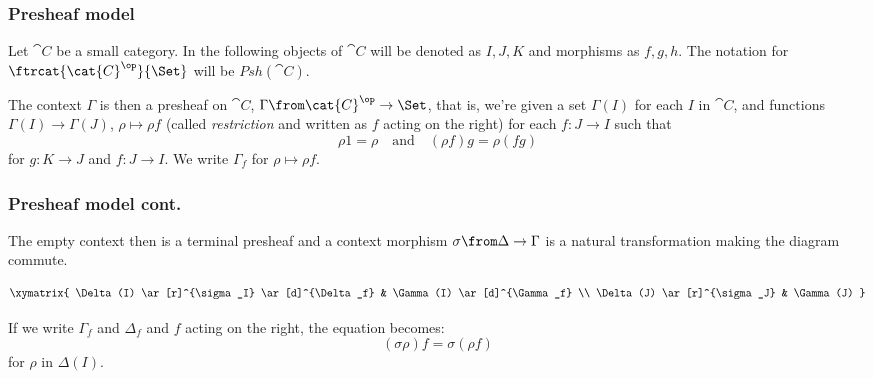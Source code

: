 \documentclass{beamer}
\begin{document}
\begin{frame}
  \frametitle{Presheaf model}

  Let $\cat{C}$ be a small category. In the following objects of $\cat{C}$ will
  be denoted as $I,J,K$ and morphisms as $f,g,h$. The notation for
  $\ftrcat{\cat{C}^\op}{\Set}$ will be $Psh(\cat{C})$.

  The context $\Gamma$ is then a presheaf on $\cat{C}$, $\Gamma \from
  \cat{C}^\op \to \Set$, that is, we're given a set $\Gamma(I)$ for each
  $I$ in $\cat{C}$, and functions $\Gamma(I) \to \Gamma(J)$, $\rho \mapsto \rho
  f$ (called \emph{restriction} and written as $f$ acting on the right) for each
  $f: J \to I$ such that
  \[
    \rho 1 = \rho \quad \text{and} \quad (\rho f) g = \rho (f g)
  \]
  for $g: K \to J$ and $f: J \to I$. We write $\Gamma_f$ for $\rho \mapsto \rho
  f$.
\end{frame}

\begin{frame}

  \frametitle{Presheaf model cont.}

  The empty context then is a terminal presheaf and a context morphism $\sigma
  \from \Delta \to \Gamma$ is a natural transformation making the diagram
  commute.

  \[
    \xymatrix{
      \Delta(I) \ar[r]^{\sigma_I} \ar[d]^{\Delta_f} & \Gamma(I) \ar[d]^{\Gamma_f} \\
      \Delta(J) \ar[r]^{\sigma_J} & \Gamma(J)
    }
  \]

  If we write $\Gamma_f$ and $\Delta_f$ and $f$ acting on the right, the
  equation becomes:
  \[
    (\sigma \rho) f = \sigma (\rho f)
  \]
  for $\rho$ in $\Delta(I)$.

\end{frame}
\end{document}
